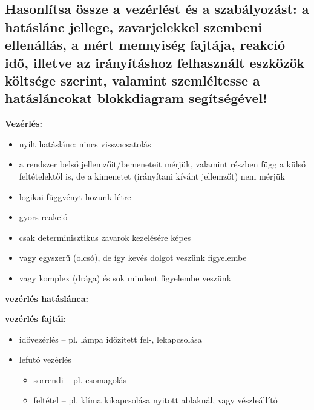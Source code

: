 \subsection{Hasonlítsa össze a vezérlést és a szabályozást: a hatáslánc jellege, zavarjelekkel szembeni ellenállás, a mért mennyiség fajtája, reakció idő, illetve az irányításhoz felhasznált eszközök költsége szerint, valamint szemléltesse a hatásláncokat blokkdiagram segítségével!}


\begin{minipage}[t]{0.48\textwidth}
    \textbf{Vezérlés:}
    \begin{itemize}
        \item nyílt hatáslánc: nincs visszacsatolás
        \item a rendszer belső jellemzőit/bemeneteit mérjük, valamint részben függ a külső feltételektől is, de a kimenetet (irányítani kívánt jellemzőt) nem mérjük
        \item logikai függvényt hozunk létre
        \item gyors reakció
        \item csak determinisztikus zavarok kezelésére képes
        \item vagy egyszerű (olcsó), de így kevés dolgot veszünk figyelembe
        \item vagy komplex (drága) és sok mindent figyelembe veszünk
    \end{itemize}

    \textbf{vezérlés hatáslánca:}

    \begin{center}
    \end{center}

    \textbf{vezérlés fajtái:}
    \begin{itemize}
        \item idővezérlés – pl. lámpa időzített fel-, lekapcsolása
        \item lefutó vezérlés
              \begin{itemize}
                  \item sorrendi – pl. csomagolás
                  \item feltétel – pl. klíma kikapcsolása nyitott ablaknál, vagy vészleállító
              \end{itemize}
    \end{itemize}
\end{minipage}
